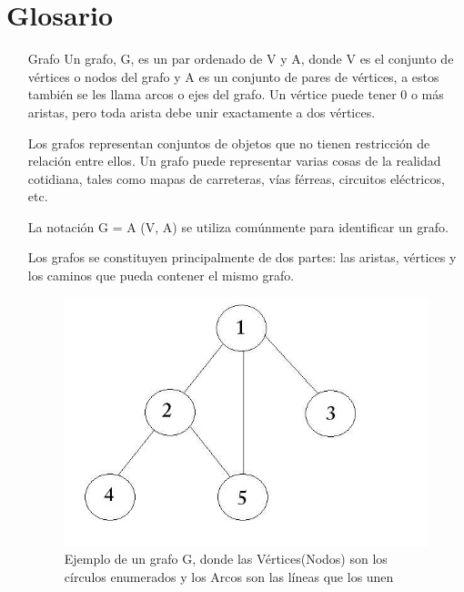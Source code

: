 \chapter*{Glosario}

\begin{enumerate}
\item [Grafo] Un grafo, G, es un par ordenado de V y A, donde V es el conjunto de vértices o nodos del grafo y A es un conjunto de pares de vértices, a estos también se les llama arcos o ejes del grafo. Un vértice puede tener 0 o más aristas, pero toda arista debe unir exactamente a dos vértices.

Los grafos representan conjuntos de objetos que no tienen restricción de relación entre ellos. Un grafo puede representar varias cosas de la realidad cotidiana, tales como mapas de carreteras, vías férreas, circuitos eléctricos, etc.

La notación G = A (V, A) se utiliza comúnmente para identificar un grafo.

Los grafos se constituyen principalmente de dos partes: las aristas, vértices y los caminos que pueda contener el mismo grafo.

\begin{figure}[hbtp]
   \centering
    \includegraphics[scale=0.8]{images/grafo.png}
   \caption{Ejemplo de un grafo G, donde las Vértices(Nodos) son los círculos enumerados y los Arcos son las líneas que los unen }
    \end{figure}
\end{enumerate}

